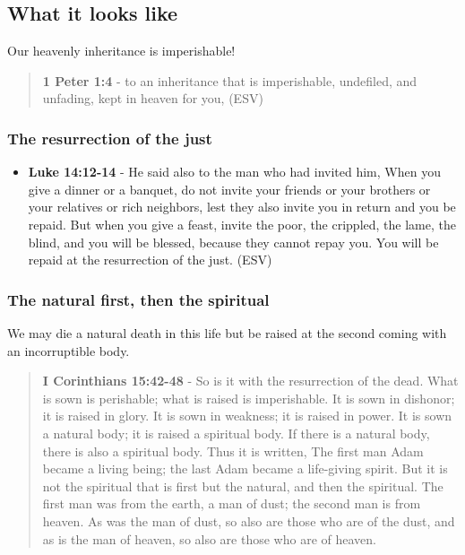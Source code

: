 \documentclass[11pt]{article}
\begin{document}
\subsection{What it looks like}
\label{sec:org5a02c95}
Our heavenly inheritance is imperishable!

\begin{quote}
\textbf{1 Peter 1:4} -  to an inheritance that is imperishable, undefiled, and unfading, kept in heaven for you,  (ESV)
\end{quote}

\subsubsection{The resurrection of the just}
\label{sec:orgbd4e719}
\begin{itemize}
\item \textbf{Luke 14:12-14} - He said also to the man who had invited him, When you give a dinner or a banquet, do not invite your friends or your brothers or your relatives or rich neighbors, lest they also invite you in return and you be repaid. But when you give a feast, invite the poor, the crippled, the lame, the blind, and you will be blessed, because they cannot repay you. You will be repaid at the resurrection of the just. (ESV)
\end{itemize}

\subsubsection{The natural first, then the spiritual}
\label{sec:org6add443}
We may die a natural death in this life but be raised at the second coming with an incorruptible body.

\begin{quote}
\textbf{I Corinthians 15:42-48} - So is it with the resurrection of the dead. What is sown is perishable; what is raised is imperishable.  It is sown in dishonor; it is raised in glory. It is sown in weakness; it is raised in power.  It is sown a natural body; it is raised a spiritual body. If there is a natural body, there is also a spiritual body.  Thus it is written, The first man Adam became a living being; the last Adam became a life-giving spirit.  But it is not the spiritual that is first but the natural, and then the spiritual.  The first man was from the earth, a man of dust; the second man is from heaven.  As was the man of dust, so also are those who are of the dust, and as is the man of heaven, so also are those who are of heaven.
\end{quote}
\end{document}
